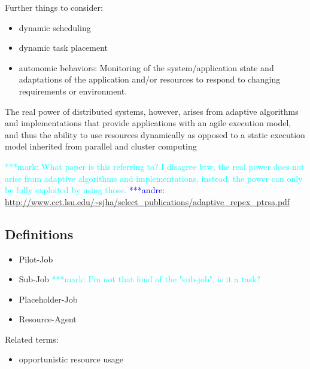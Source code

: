 \documentclass[]{article}
\newcommand{\alnote}[1]{ {\textcolor{blue} { ***andre: #1 }}}
\newcommand{\msnote}[1]{ {\textcolor{cyan} { ***mark: #1 }}}
\newcommand{\alnote}[1]{}
\begin{document}
Further things to consider:
\begin{itemize}
    \item dynamic scheduling
    \item dynamic task placement
    \item autonomic behaviors: Monitoring of the system/application state and 
    adaptations of the application and/or resources to respond to changing 
    requirements or environment.
\end{itemize}

The real power of distributed systems, however, arises from adaptive algorithms
and implementations that provide applications with an agile execution model, and
thus the ability to use resources dynamically as opposed to a static execution
model inherited from parallel and cluster computing

\msnote{What paper is this referring to? I disagree btw, the real power does not arise from adaptive algorithms and implementations, instead, the power can only be fully exploited by using those.}\alnote{\url{http://www.cct.lsu.edu/~sjha/select_publications/adaptive_repex_ptrsa.pdf}}

\subsection{Definitions}

\begin{itemize}
	\item Pilot-Job
	\item Sub-Job
	\msnote{I'm not that fond of the "sub-job", is it a task?}
	\item Placeholder-Job
	\item Resource-Agent
\end{itemize}


Related terms:
\begin{itemize}
	\item opportunistic resource usage
\end{itemize}
\end{document}
